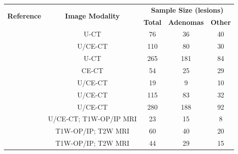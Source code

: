 \documentclass{article}
\begin{document}
\begin{table}[]
    \centering
    \begin{tabular}{ccccc}\toprule
        \multirow{2}{*}{\textbf{Reference}} & \multirow{2}{*}{\textbf{Image Modality}} & \multicolumn{3}{c}{\textbf{Sample Size (lesions)}}
        \\\cmidrule(lr){3-5}
                                            &                                          & \textbf{Total}                                     & \textbf{Adenomas} & \textbf{Other} \\\midrule
        \cite{Tu2018}                       & U-CT                                     & 76                                                 & 36                & 40             \\
        \cite{Yi20181}                      & U/CE-CT                                  & 110                                                & 80                & 30             \\
        \cite{Yi2018}                       & U-CT                                     & 265                                                & 181               & 84             \\
        \cite{Elmohr2019}                   & CE-CT                                    & 54                                                 & 25                & 29             \\
        \cite{Torresan2021}                 & U/CE-CT                                  & 19                                                 & 9                 & 10             \\
        \cite{Kusunoki2022}                 & U/CE-CT                                  & 115                                                & 83                & 32             \\
        \cite{Liu2022}                      & U/CE-CT                                  & 280                                                & 188               & 92             \\
        \cite{Ho2019}                       & U/CE-CT; T1W-OP/IP MRI                   & 23                                                 & 15                & 8              \\
        \cite{Liu2021}                      & T1W-OP/IP; T2W MRI                       & 60                                                 & 40                & 20             \\
        \cite{Schieda2017}                  & T1W-OP/IP; T2W MRI                       & 44                                                 & 29                & 15             \\

\end{tabular}
\end{table}
\end{document}
